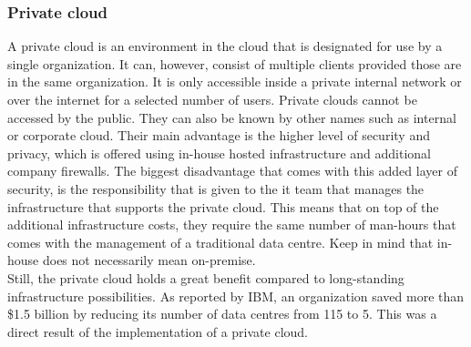 \subsubsection{Private cloud}
A private cloud is an environment in the cloud that is designated for use by a single organization. 
It can, however, consist of multiple clients provided those are in the same organization. 
It is only accessible inside a private internal network or over the internet for a selected number of users. 
Private clouds cannot be accessed by the public. 
They can also be known by other names such as internal or corporate cloud. 
Their main advantage is the higher level of security and privacy, which is offered using in-house hosted infrastructure and additional company firewalls. 
The biggest disadvantage that comes with this added layer of security, is the responsibility that is given to the \acrshort{it} team that manages the infrastructure that supports the private cloud. 
This means that on top of the additional infrastructure costs, they require the same number of man-hours that comes with the management of a traditional data centre. 
Keep in mind that in-house does not necessarily mean on-premise.
\\
Still, the private cloud holds a great benefit compared to long-standing infrastructure possibilities. 
As reported by IBM, an organization saved more than \$1.5 billion by reducing its number of data centres from 115 to 5. 
This was a direct result of the implementation of a private cloud. \autocite{Hofmann2010} 


